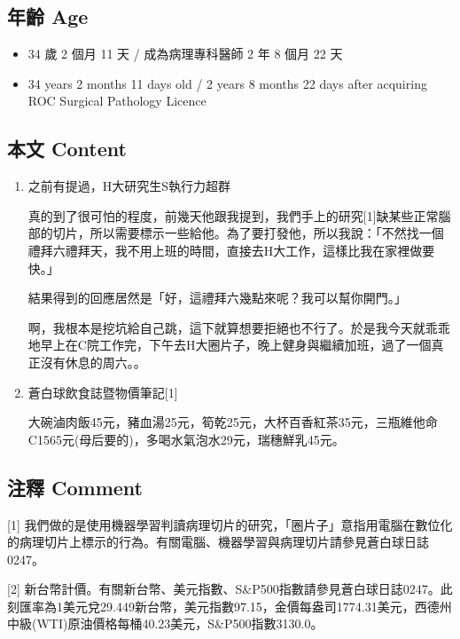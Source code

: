 \documentclass[a5paper, 11pt
]{book}
\providecommand{\tightlist}{%
  \setlength{\itemsep}{0pt}\setlength{\parskip}{0pt}}
\begin{document}
\hypertarget{ux5e74ux9f61-age-33}{%
\subsection{年齡 Age}\label{ux5e74ux9f61-age-33}}

\begin{itemize}
\tightlist
\item
  34 歲 2 個月 11 天 / 成為病理專科醫師 2 年 8 個月 22 天
\item
  34 years 2 months 11 days old / 2 years 8 months 22 days after
  acquiring ROC Surgical Pathology Licence
\end{itemize}

\hypertarget{ux672cux6587-content-33}{%
\subsection{本文 Content}\label{ux672cux6587-content-33}}

\begin{enumerate}
\def\labelenumi{\arabic{enumi}.}
\item
  之前有提過，H大研究生S執行力超群

  真的到了很可怕的程度，前幾天他跟我提到，我們手上的研究{[}1{]}缺某些正常腦部的切片，所以需要標示一些給他。為了要打發他，所以我說：「不然找一個禮拜六禮拜天，我不用上班的時間，直接去H大工作，這樣比我在家裡做要快。」

  結果得到的回應居然是「好，這禮拜六幾點來呢？我可以幫你開門。」

  啊，我根本是挖坑給自己跳，這下就算想要拒絕也不行了。於是我今天就乖乖地早上在C院工作完，下午去H大圈片子，晚上健身與繼續加班，過了一個真正沒有休息的周六。。
\item
  蒼白球飲食誌暨物價筆記{[}1{]}

  大碗滷肉飯45元，豬血湯25元，筍乾25元，大杯百香紅茶35元，三瓶維他命C1565元(母后要的)，多喝水氣泡水29元，瑞穗鮮乳45元。
\end{enumerate}

\hypertarget{ux6ce8ux91cb-comment-33}{%
\subsection{注釋 Comment}\label{ux6ce8ux91cb-comment-33}}

{[}1{]}
我們做的是使用機器學習判讀病理切片的研究，「圈片子」意指用電腦在數位化的病理切片上標示的行為。有關電腦、機器學習與病理切片請參見蒼白球日誌0247。

{[}2{]}
新台幣計價。有關新台幣、美元指數、S\&P500指數請參見蒼白球日誌0247。此刻匯率為1美元兌29.449新台幣，美元指數97.15，金價每盎司1774.31美元，西德州中級(WTI)原油價格每桶40.23美元，S\&P500指數3130.0。
\end{document}
